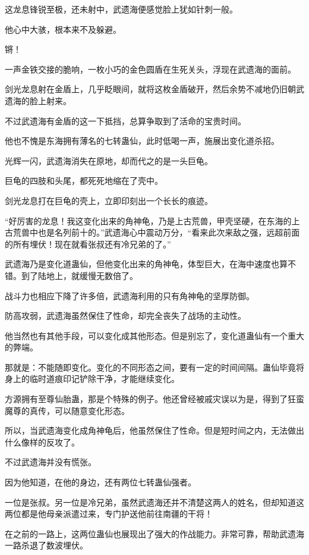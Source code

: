 
\begin{this_body}

这龙息锋锐至极，还未射中，武遗海便感觉脸上犹如针刺一般。

他心中大骇，根本来不及躲避。

锵！

一声金铁交接的脆响，一枚小巧的金色圆盾在生死关头，浮现在武遗海的面前。

剑光龙息射在金盾上，几乎眨眼间，就将这枚金盾破开，然后余势不减地仍旧朝武遗海的脸上射来。

不过武遗海有金盾的这一下抵挡，总算争取到了活命的宝贵时间。

他也不愧是东海拥有薄名的七转蛊仙，此时低喝一声，施展出变化道杀招。

光辉一闪，武遗海消失在原地，却而代之的是一头巨龟。

巨龟的四肢和头尾，都死死地缩在了壳中。

剑光龙息打在巨龟的壳上，立即印刻出一个长长的痕迹。

“好厉害的龙息！我这变化出来的角神龟，乃是上古荒兽，甲壳坚硬，在东海的上古荒兽中也是名列前十的。”武遗海心中震动万分，“看来此次来敌之强，远超前面的所有埋伏！现在就看张叔还有冷兄弟的了。”

武遗海乃是变化道蛊仙，但他变化出来的角神龟，体型巨大，在海中速度也算不错。到了陆地上，就缓慢无数倍了。

战斗力也相应下降了许多倍，武遗海利用的只有角神龟的坚厚防御。

防高攻弱，武遗海虽然保住了性命，却完全丧失了战场的主动性。

他当然也有其他手段，可以变化成其他形态。但是别忘了，变化道蛊仙有一个重大的弊端。

那就是：不能随即变化。变化的不同形态之间，要有一定的时间间隔。蛊仙毕竟将身上的临时道痕印记铲除干净，才能继续变化。

方源拥有至尊仙胎蛊，那是个特殊的例子。他还曾经被戚灾误以为是，得到了狂蛮魔尊的真传，可以随意变化形态。

所以，当武遗海变化成角神龟后，他虽然保住了性命。但是短时间之内，无法做出什么像样的反攻了。

不过武遗海并没有慌张。

因为他知道，在他的身边，还有两位七转蛊仙强者。

一位是张叔。另一位是冷兄弟，虽然武遗海还并不清楚这两人的姓名，但却知道这两位都是他母亲派遣过来，专门护送他前往南疆的干将！

在之前的一路上，这两位蛊仙也展现出了强大的作战能力。非常可靠，帮助武遗海一路杀退了数波埋伏。


\end{this_body}
